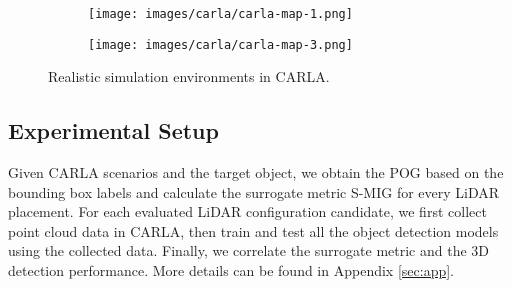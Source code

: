 \documentclass[10pt,twocolumn,letterpaper]{article}
\begin{document}
\begin{figure}[t!]
\begin{center}
    \begin{subfigure}[b]{0.235\textwidth}
                \texttt{[image: images/carla/carla-map-1.png]}
                \caption{}
                \label{fig:carla-map-4}
    \end{subfigure}
    \begin{subfigure}[b]{0.235\textwidth}
                \texttt{[image: images/carla/carla-map-3.png]}
                \caption{}
                \label{fig:carla-map-3}
    \end{subfigure}%
\end{center}
\vspace{-7mm}
  \caption{Realistic simulation environments in CARLA.}
\label{fig:carla-maps}
\vspace{-5mm}
\end{figure}




\subsection{Experimental Setup}
 Given CARLA scenarios and the target object, we obtain the POG based on the bounding box labels and calculate the surrogate metric S-MIG for every LiDAR placement. For each evaluated LiDAR configuration candidate,  we first collect point cloud data in CARLA,  then train and test all the object detection models using the collected data. Finally, we correlate the surrogate metric and the 3D detection performance. More details can be found in Appendix \ref{sec:app}.
%
\end{document}
